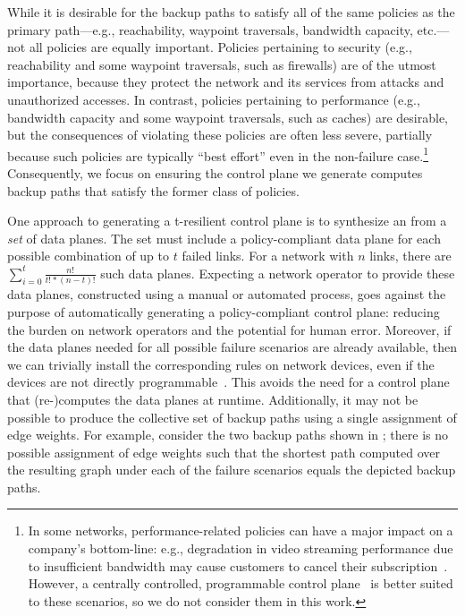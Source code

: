 While it is desirable for the backup paths to satisfy all of the same policies
as the primary path---e.g., reachability, waypoint traversals, bandwidth
capacity, etc.---not all policies are equally important.  Policies pertaining
to security (e.g., reachability and some waypoint traversals, such as
firewalls) are of the utmost importance, because they protect the network and
its services from attacks and unauthorized accesses.  In contrast, policies
pertaining to performance (e.g., bandwidth capacity and some waypoint
traversals, such as caches) are desirable, but the consequences of violating
these policies are often less severe, partially because such policies are
typically ``best effort'' even in the non-failure case.\footnote{In some
networks, performance-related policies can have a major impact on a company's
bottom-line: e.g., degradation in video streaming performance due to
insufficient bandwidth may cause customers to cancel their
subscription~\cite{TBD}. However, a centrally controlled, programmable control
plane~\cite{swan, b4} is better suited to these scenarios, so we do not
consider them in this work.} Consequently, we focus on ensuring the control
plane we generate computes backup paths that satisfy the former class of
policies.  

One approach to generating a t-resilient control plane is to synthesize an
\ARC from a {\em set} of data planes. The set must include a policy-compliant
data plane for each possible combination of up to $t$ failed links. For a
network with $n$ links, there are $\sum_{i=0}^{t} \frac{n!}{t! * (n-t)!}$ such
data planes. Expecting a network operator to provide these data planes,
constructed using a manual or automated process, goes against the purpose of
automatically generating a policy-compliant control plane: reducing the burden
on network operators and the potential for human error. Moreover, if the data
planes needed for all possible failure scenarios are already available, then
we can trivially install the corresponding rules on network devices, even if
the devices are not directly programmable~\cite{TODO}. This avoids the need
for a control plane that (re-)computes the data planes at runtime.
Additionally, it may not be possible to produce the collective set of backup
paths using a single assignment of edge weights. For example, consider the two
backup paths shown in ; there is no possible assignment of
edge weights such that the shortest path computed over the resulting graph
under each of the failure scenarios equals the depicted backup paths.


